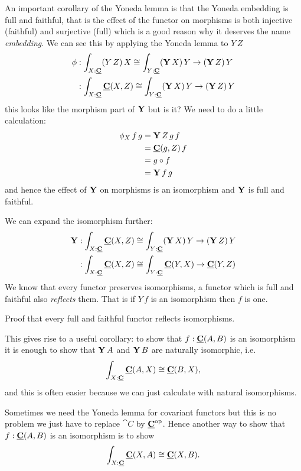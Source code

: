 An important corollary of the Yoneda lemma is that the Yoneda embedding is full and faithful, that is the effect of the functor on morphisms is both injective (faithful) and surjective (full) which is a good reason why it deserves the name \emph{embedding}. We can see this by applying the Yoneda lemma to $Y\,Z$
\begin{align*}
  \phi & : \int_{X:\underline{\mathbf{C}}} (Y\,Z)\,X \cong \int_{Y : \underline{\mathbf{C}}} (\mathbf{Y}\,X)\,Y \to (\mathbf{Y}\,Z)\,Y \\
         & : \int_{X:\underline{\mathbf{C}}} \underline{\mathbf{C}}(X,Z) \cong \int_{Y : \underline{\mathbf{C}}} (\mathbf{Y}\,X)\,Y \to (\mathbf{Y}\,Z)\,Y \\
\end{align*}
this looks like the morphism part of $\mathbf{Y}$ but is it? We need to do a little calculation:
\begin{align*}
\phi_X\,f\,g & = \mathbf{Y}\,Z\,g\,f\\
& = \underline{\mathbf{C}}(g,Z)\,f\\
& = g \circ f \\
& = \mathbf{Y}\,f\,g
\end{align*}
and hence the effect of $\mathbf{Y}$ on morphisms is an isomorphism and $\mathbf{Y}$ is full and faithful. 

We can expand the isomorphism further:
\begin{align*}
\mathbf{Y}      & : \int_{X:\underline{\mathbf{C}}} \underline{\mathbf{C}}(X,Z) \cong \int_{Y : \underline{\mathbf{C}}} (\mathbf{Y}\,X)\,Y \to (\mathbf{Y}\,Z)\,Y \\
         & : \int_{X:\underline{\mathbf{C}}} \underline{\mathbf{C}}(X,Z) \cong \int_{Y : \underline{\mathbf{C}}} \underline{\mathbf{C}}(Y,X)\to \underline{\mathbf{C}}(Y,Z)
\end{align*}
We know that every functor preserves isomorphisms, a functor which is full and faithful also \emph{reflects} them. That is if $Y\,f$ is an isomorphism then $f$ is one. 
\begin{Exercise}
  Proof that every full and faithful functor reflects isomorphisms. 
\end{Exercise}
This gives rise to a useful corollary: to show that $f : \underline{\mathbf{C}}(A,B)$ is an isomorphism it is enough to show that $\mathbf{Y}\,A$ and $\mathbf{Y}\,B$ are naturally isomorphic, i.e.
\[ \int_{X:\underline{\mathbf{C}}} \underline{\mathbf{C}}(A,X) \cong \underline{\mathbf{C}}(B,X) ,\]
and this is often easier because we can just calculate with natural isomorphisms.

Sometimes we need the Yoneda lemma for covariant functors but this is no problem we just have to replace $\cat{C}$ by $\underline{\mathbf{C}}^{\mathrm{op}}$. Hence another way to show that $f:\underline{\mathbf{C}}(A,B)$ is an isomorphism is to show
\[ \int_{X:\underline{\mathbf{C}}} \underline{\mathbf{C}}(X,A) \cong \underline{\mathbf{C}}(X,B). \]


